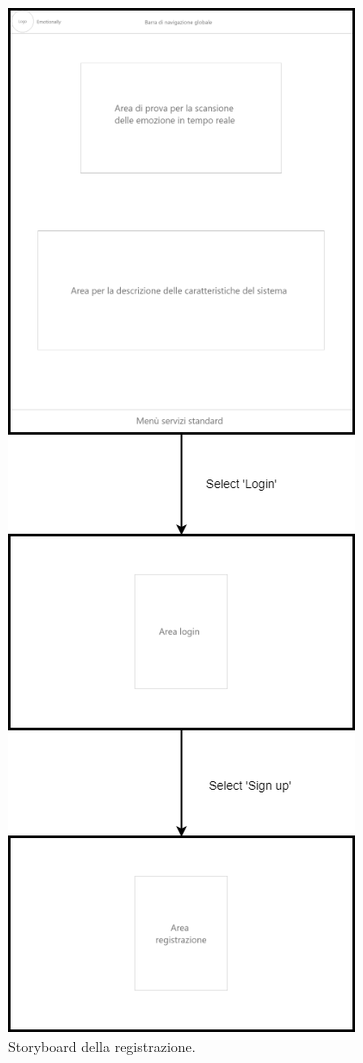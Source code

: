 \begin{figure}[H]
	\centering
	\caption{Storyboard della registrazione.}
	\label{fig:storyboard:sign-up}
	\includegraphics[height=\textheight-3ex]{images/storyboard/sign-up}
\end{figure}
